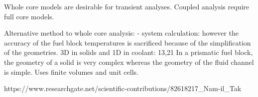 Whole core models are desirable for transient analyses.
Coupled analysis require full core models.

Alternative method to whole core analysis:
- system calculation: however the accuracy of the fuel block temperatures is sacrificed because of the simplification of the geometries.
3D in solids and 1D in coolant:
13,21
In a prismatic fuel block, the geometry of a solid is very complex whereas the geometry of the fluid channel is simple.
Uses finite volumes and unit cells.


https://www.researchgate.net/scientific-contributions/82618217_Nam-il_Tak




